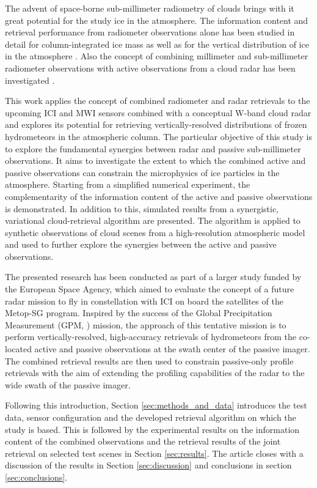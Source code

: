 \documentclass[journal abbreviation, manuscript]{copernicus}
\begin{document}
The advent of space-borne sub-millimeter radiometry of clouds brings with it
great potential for the study ice in the atmosphere. The information content and
retrieval performance from radiometer observations alone has been studied in
detail for column-integrated ice mass \citep{jimenez07, wang17, brath18a} as
well as for the vertical distribution of ice in the atmosphere \citep{birman17, grutzun18,
  aires19}. Also the concept of combining millimeter and sub-millimeter
radiometer observations with active observations from a cloud radar has been
investigated \citep{evans05, jiang19}.

This work applies the concept of combined radiometer and radar retrievals to the
upcoming ICI and MWI sensors combined with a conceptual W-band cloud radar and
explores its potential for retrieving vertically-resolved distributions of
frozen hydrometeors in the atmospheric column. The particular objective of this
study is to explore the fundamental synergies between radar and passive
sub-millimeter observations. It aims to investigate the extent to which the
combined active and passive observations can constrain the microphysics of ice
particles in the atmosphere. Starting from a simplified numerical experiment,
the complementarity of the information content of the active and passive
observations is demonstrated. In addition to this, simulated results from a
synergistic, variational cloud-retrieval algorithm are presented. The algorithm
is applied to synthetic observations of cloud scenes from a high-resolution
atmospheric model and used to further explore the synergies between the active
and passive observations.

The presented research has been conducted as part of a larger study funded by
the European Space Agency, which aimed to evaluate the concept of a future radar
mission to fly in constellation with ICI on board the satellites of the Metop-SG
program. Inspired by the success of the Global Precipitation Measurement (GPM,
\cite{hou14}) mission, the approach of this tentative mission is to perform
vertically-resolved, high-accuracy retrievals of hydrometeors from the
co-located active and passive observations at the swath center of the passive
imager. The combined retrieval results are then used to constrain passive-only
profile retrievals with the aim of extending the profiling capabilities of the
radar to the wide swath of the passive imager.

Following this introduction, Section \ref{sec:methods_and_data} introduces the
test data, sensor configuration and the developed retrieval algorithm on which
the study is based. This is followed by the experimental results on the
information content of the combined observations and the retrieval results of
the joint retrieval on selected test scenes in Section \ref{sec:results}. The
article closes with a discussion of the results in Section \ref{sec:discussion}
and conclusions in section \ref{sec:conclusions}.
\end{document}
